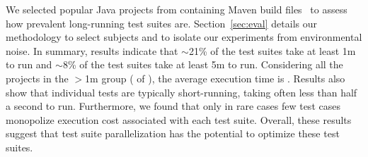 



We selected \numSubjs{} popular Java projects from \github{}
containing Maven build files~\cite{maven} to assess how prevalent
long-running test suites are.  Section~\ref{sec:eval} details our
methodology to select subjects and to isolate our experiments from
environmental noise.  In summary, results indicate that $\sim$21\% of
the test suites take at least 1m to run and $\sim$8\% of the test
suites take at least 5m to run.  Considering all the \numMedLong{}
projects in the $>$1m group (\percentMedLongRunning{} of
\numSubjs{}), the
average execution time is \averageMedLongRunning{}.  Results also show
that individual tests are typically short-running, taking often less
than half a second to run.  Furthermore, we found that only in rare
cases few test cases monopolize execution cost associated with each
test suite.  Overall, these results suggest that test suite
parallelization has the potential to optimize these test suites.

